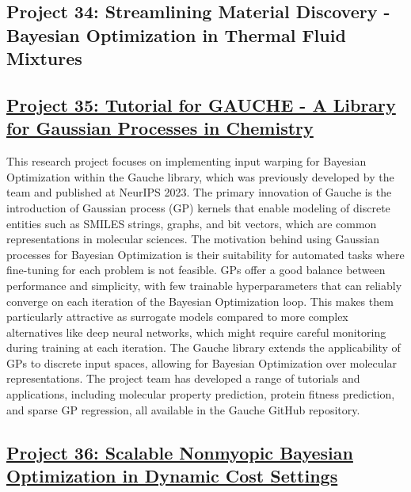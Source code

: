  \subsection*{Project 34: Streamlining Material Discovery - Bayesian Optimization in Thermal Fluid Mixtures}


 \subsection*{\href{https://x.com/Ryan__Rhys/status/1820723528469262419}{Project 35: Tutorial for GAUCHE - A Library for Gaussian Processes in Chemistry}}

This research project focuses on implementing input warping for Bayesian Optimization within the Gauche library\cite{griffiths_gauche_2024}, which was previously developed by the team and published at NeurIPS 2023. The primary innovation of Gauche is the introduction of Gaussian process (GP) kernels that enable modeling of discrete entities such as SMILES strings, graphs, and bit vectors, which are common representations in molecular sciences. The motivation behind using Gaussian processes for Bayesian Optimization is their suitability for automated tasks where fine-tuning for each problem is not feasible. GPs offer a good balance between performance and simplicity, with few trainable hyperparameters that can reliably converge on each iteration of the Bayesian Optimization loop. This makes them particularly attractive as surrogate models compared to more complex alternatives like deep neural networks, which might require careful monitoring during training at each iteration. The Gauche library extends the applicability of GPs to discrete input spaces, allowing for Bayesian Optimization over molecular representations. The project team has developed a range of tutorials and applications, including molecular property prediction, protein fitness prediction, and sparse GP regression, all available in the Gauche GitHub repository.
 \subsection*{\href{https://youtu.be/CXweDiS_wbI}{Project 36: Scalable Nonmyopic Bayesian Optimization in Dynamic Cost Settings}}

